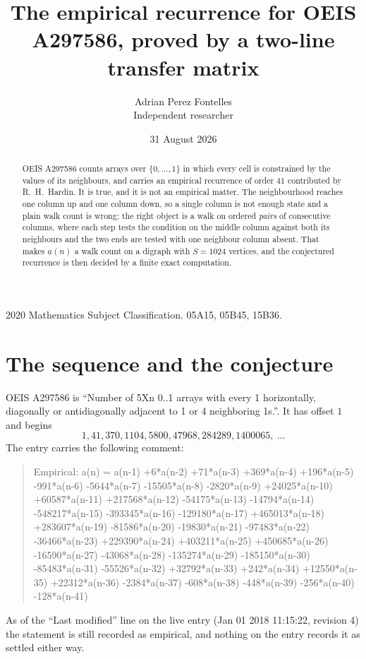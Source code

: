 \documentclass[11pt,a4paper]{article}
\title{The empirical recurrence for OEIS A297586, proved by a two-line transfer matrix}
\author{Adrian Perez Fontelles\\ \small Independent researcher}
\date{31 August 2026}
\theoremstyle{plain}
\theoremstyle{definition}
\begin{document}
\maketitle

\begin{abstract}
OEIS A297586 counts arrays over $\{0,\dots,1\}$ in which every cell is constrained by the
values of its neighbours, and carries an empirical recurrence of order $41$ contributed
by R.~H.~Hardin. It is true, and it is not an empirical matter. The neighbourhood reaches one
column up and one column down, so a single column is not enough state and a plain walk count
is wrong; the right object is a walk on ordered \emph{pairs} of consecutive columns, where
each step tests the condition on the middle column against both its neighbours and the two
ends are tested with one neighbour column absent. That makes $a(n)$ a walk count on a digraph
with $S=1024$ vertices, and the conjectured recurrence is then decided by a finite exact
computation.
\end{abstract}

\noindent\small 2020 Mathematics Subject Classification. 05A15, 05B45, 15B36.\normalsize

\section{The sequence and the conjecture}

OEIS A297586 is ``Number of 5Xn 0..1 arrays with every 1 horizontally, diagonally or antidiagonally adjacent to 1 or 4 neighboring 1s.''. It has offset $1$ and begins
\[
1, 41, 370, 1104, 5800, 47968, 284289, 1400065,\ \dots
\]
The entry carries the following comment:
\begin{quote}\small
Empirical: a(n) = a(n-1) +6*a(n-2) +71*a(n-3) +369*a(n-4) +196*a(n-5) -991*a(n-6) -5644*a(n-7) -15505*a(n-8) -2820*a(n-9) +24025*a(n-10) +60587*a(n-11) +217568*a(n-12) -54175*a(n-13) -14794*a(n-14) -548217*a(n-15) -393345*a(n-16) -129180*a(n-17) +465013*a(n-18) +283607*a(n-19) -81586*a(n-20) -19830*a(n-21) -97483*a(n-22) -36466*a(n-23) +229390*a(n-24) +403211*a(n-25) +450685*a(n-26) -16590*a(n-27) -43068*a(n-28) -135274*a(n-29) -185150*a(n-30) -85483*a(n-31) -55526*a(n-32) +32792*a(n-33) +242*a(n-34) +12550*a(n-35) +22312*a(n-36) -2384*a(n-37) -608*a(n-38) -448*a(n-39) -256*a(n-40) -128*a(n-41)
\end{quote}
As of the ``Last modified'' line on the live entry (Jan 01 2018 11:15:22, revision 4) the statement is
still recorded as empirical, and nothing on the entry records it as settled either way.
\end{document}
